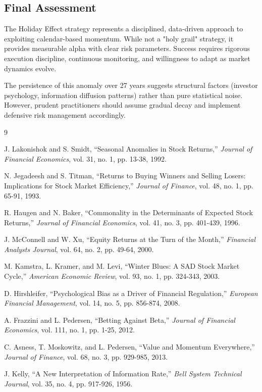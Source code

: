 \documentclass[twocolumn,ieee]{arithmaxresearch}
\begin{document}
\subsection{Final Assessment}

The Holiday Effect strategy represents a disciplined, data-driven approach to exploiting calendar-based momentum. While not a "holy grail" strategy, it provides measurable alpha with clear risk parameters. Success requires rigorous execution discipline, continuous monitoring, and willingness to adapt as market dynamics evolve.

The persistence of this anomaly over 27 years suggests structural factors (investor psychology, information diffusion patterns) rather than pure statistical noise. However, prudent practitioners should assume gradual decay and implement defensive risk management accordingly.

\begin{thebibliography}{9}

J. Lakonishok and S. Smidt, ``Seasonal Anomalies in Stock Returns,'' \emph{Journal of Financial Economics}, vol. 31, no. 1, pp. 13-38, 1992.

N. Jegadeesh and S. Titman, ``Returns to Buying Winners and Selling Losers: Implications for Stock Market Efficiency,'' \emph{Journal of Finance}, vol. 48, no. 1, pp. 65-91, 1993.

R. Haugen and N. Baker, ``Commonality in the Determinants of Expected Stock Returns,'' \emph{Journal of Financial Economics}, vol. 41, no. 3, pp. 401-439, 1996.

J. McConnell and W. Xu, ``Equity Returns at the Turn of the Month,'' \emph{Financial Analysts Journal}, vol. 64, no. 2, pp. 49-64, 2000.

M. Kamstra, L. Kramer, and M. Levi, ``Winter Blues: A SAD Stock Market Cycle,'' \emph{American Economic Review}, vol. 93, no. 1, pp. 324-343, 2003.

D. Hirshleifer, ``Psychological Bias as a Driver of Financial Regulation,'' \emph{European Financial Management}, vol. 14, no. 5, pp. 856-874, 2008.

A. Frazzini and L. Pedersen, ``Betting Against Beta,'' \emph{Journal of Financial Economics}, vol. 111, no. 1, pp. 1-25, 2012.

C. Asness, T. Moskowitz, and L. Pedersen, ``Value and Momentum Everywhere,'' \emph{Journal of Finance}, vol. 68, no. 3, pp. 929-985, 2013.

J. Kelly, ``A New Interpretation of Information Rate,'' \emph{Bell System Technical Journal}, vol. 35, no. 4, pp. 917-926, 1956.

\end{thebibliography}
\end{document}
